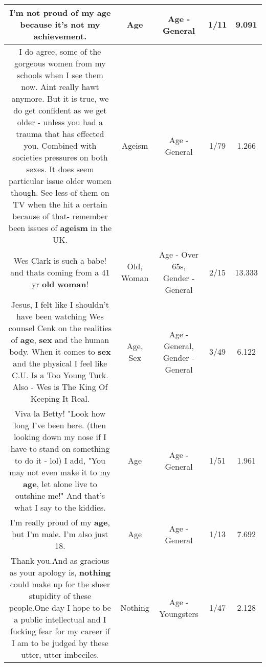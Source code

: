 \documentclass[11pt]{article}
\newlength\mylength
\begin{document}
\begin{center}
\begin{longtable}{|C{.65\mylength}|C{.30\mylength}|C{.12\mylength}|C{.12\mylength}|C{.12\mylength}|}
  \small I'm not proud of my \textbf{age} because it's not my achievement.\normalsize   & Age & Age - General & 1/11 & 9.091 \\  \hline
  \small I do agree, some of the gorgeous women from my schools when I see them now. Aint really hawt anymore. But it is true, we do get confident as we get older - unless you had a trauma that has effected you. Combined with societies pressures on both sexes. It does seem particular issue older women though. See less of them on TV when the hit a certain because of that- remember been issues of \textbf{ageism} in the UK.\normalsize   & Ageism & Age - General & 1/79 & 1.266 \\  \hline
  \small Wes Clark is such a babe! and thats coming from a 41 yr \textbf{old} \textbf{woman}!\normalsize   & Old, Woman & Age - Over 65s, Gender - General & 2/15 & 13.333 \\  \hline
  \small Jesus, I felt like I shouldn't have been watching Wes counsel Cenk on the realities of \textbf{age}, \textbf{sex} and the human body. When it comes to \textbf{sex} and the physical I feel like C.U. Is a Too Young Turk. Also - Wes is The King Of Keeping It Real.\normalsize   & Age, Sex & Age - General, Gender - General & 3/49 & 6.122 \\  \hline
  \small Viva la Betty!  "Look how long I've been here. (then looking down my nose if I have to stand on something to do it - lol) I add, "You may not even make it to my \textbf{age}, let alone live to outshine me!"  And that's what I say to the kiddies.\normalsize   & Age & Age - General & 1/51 & 1.961 \\  \hline
  \small I'm really proud of my \textbf{age}, but I'm male. I'm also just 18.\normalsize   & Age & Age - General & 1/13 & 7.692 \\  \hline
  \small Thank you.And as gracious as your apology is, \textbf{nothing} could make up for the sheer stupidity of these people.One day I hope to be a public intellectual and I fucking fear for my career if I am to be judged by these utter, utter imbeciles.\normalsize   & Nothing & Age - Youngsters & 1/47 & 2.128 \\  \hline

\end{longtable}
\end{center}
\end{document}
